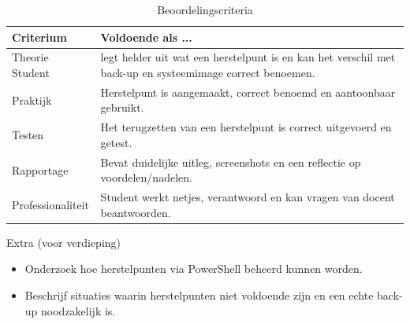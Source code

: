 \begin{flushleft}
\begin{table}[h!]
\centering
\begin{tabularx}{\textwidth}{ |X|X| }
\hline
Criterium & Voldoende als ... \\
\hline
Theorie	Student & legt helder uit wat een herstelpunt is en kan het verschil met back-up en systeemimage correct benoemen. \\
\hline
Praktijk & Herstelpunt is aangemaakt, correct benoemd en aantoonbaar gebruikt. \\
\hline
Testen	& Het terugzetten van een herstelpunt is correct uitgevoerd en getest. \\
\hline
Rapportage & Bevat duidelijke uitleg, screenshots en een reflectie op voordelen/nadelen. \\
\hline
Professionaliteit & Student werkt netjes, verantwoord en kan vragen van docent beantwoorden. \\

\hline
\end{tabularx}
\caption{Beoordelingscriteria}
\label{table:facility}
\end{table}
\end{flushleft}

Extra (voor verdieping)
\begin{itemize}
\item Onderzoek hoe herstelpunten via PowerShell beheerd kunnen worden.
\item Beschrijf situaties waarin herstelpunten niet voldoende zijn en een echte back-up noodzakelijk is.
\end{itemize}

